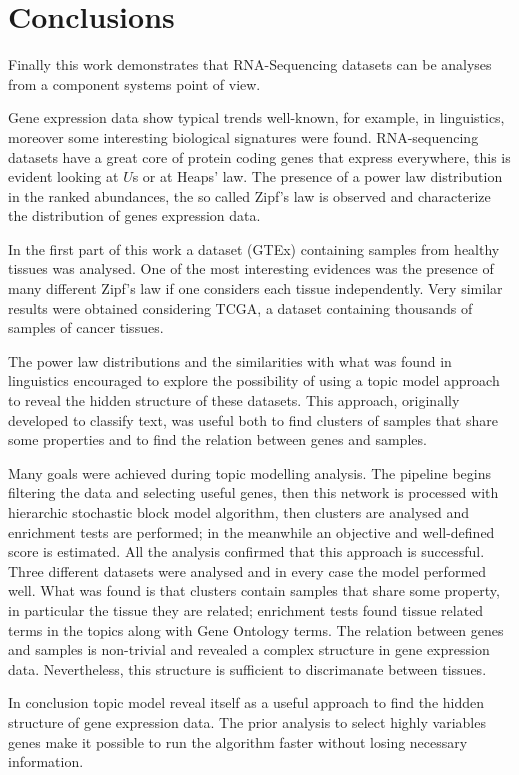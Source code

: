 \chapter{Conclusions}\label{ch:conclusions}
Finally this work demonstrates that RNA-Sequencing datasets can be analyses from a component systems point of view.

Gene expression data show typical trends well-known, for example, in linguistics, moreover some interesting biological signatures were found. RNA-sequencing datasets have a great core of protein coding genes that express everywhere, this is evident looking at $U$s or at Heaps' law. The presence of a power law distribution in the ranked abundances, the so called Zipf's law is observed and characterize the distribution of genes expression data.

In the first part of this work a dataset (GTEx) containing samples from healthy tissues was analysed. One of the most interesting evidences was the presence of many different Zipf's law if one considers each tissue independently. Very similar results were obtained considering TCGA, a dataset containing thousands of samples of cancer tissues.

The power law distributions and the similarities with what was found in linguistics encouraged to explore the possibility of using a topic model approach to reveal the hidden structure of these datasets. This approach, originally developed to classify text, was useful both to find clusters of samples that share some properties and to find the relation between genes and samples.

Many goals were achieved during topic modelling analysis.
The pipeline begins filtering the data and selecting useful genes, then this network is processed with hierarchic stochastic block model algorithm, then clusters are analysed and enrichment tests are performed; in the meanwhile an objective and well-defined score is estimated. All the analysis confirmed that this approach is successful. Three different datasets were analysed and in every case the model performed well. What was found is that clusters contain samples that share some property, in particular the tissue they are related; enrichment tests found tissue related terms in the topics along with Gene Ontology terms. The relation between genes and samples is non-trivial and revealed a complex structure in gene expression data. Nevertheless, this structure is sufficient to discrimanate between tissues.

In conclusion topic model reveal itself as a useful approach to find the hidden structure of gene expression data. The prior analysis to select highly variables genes make it possible to run the algorithm faster without losing necessary information.

